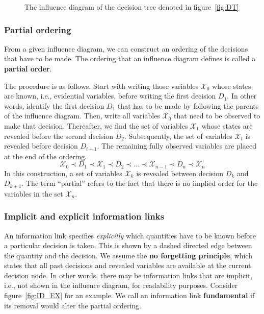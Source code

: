 \documentclass{article}
\begin{document}
\begin{figure}[H]
    \centering
    \caption{The influence diagram of the decision tree denoted in figure~\ref{fig:DT}}
    \label{fig:ID}
\end{figure}

\subsubsection{Partial ordering}

From a given influence diagram, we can construct an ordering of the decisions that have to be made. The ordering that an influence diagram defines is called a \textbf{partial order}. 

The procedure is as follows. Start with writing those variables $\mathcal{X}_0$ whose states are known, i.e., evidential variables, before writing the first decision $D_1$. In other words, identify the first decision $D_1$ that has to be made by following the parents of the influence diagram. Then, write all variables $\mathcal{X}_0$ that need to be observed to make that decision. Thereafter, we find the set of variables $\mathcal{X}_1$ whose states are revealed before the second decision $D_2$. Subsequently, the set of variables $\mathcal{X}_t$ is revealed before decision $D_{t+1}$. The remaining fully observed variables are placed at the end of the ordering. 
$$
    \mathcal{X}_0 \prec D_1 \prec \mathcal{X}_1 \prec D_2 \prec \dots \prec \mathcal{X}_{n-1} \prec D_n \prec \mathcal{X}_n
$$
\noindent In this construction, a set of variables $\mathcal{X}_k$ is revealed between decision $D_k$ and $D_{k+1}$. The term ``partial'' refers to the fact that there is no implied order for the variables in the set $\mathcal{X}_n$.  

\subsubsection{Implicit and explicit information links}

An information link specifies \textit{explicitly} which quantities have to be known before a particular decision is taken. This is shown by a dashed directed edge between the quantity and the decision. We assume the \textbf{no forgetting principle}, which states that all past decisions and revealed variables are available at the current decision node. In other words, there may be information links that are implicit, i.e., not shown in the influence diagram, for readability purposes. Consider figure~\ref{fig:ID_EX} for an example. We call an information link \textbf{fundamental} if its removal would alter the partial ordering.  
\end{document}
